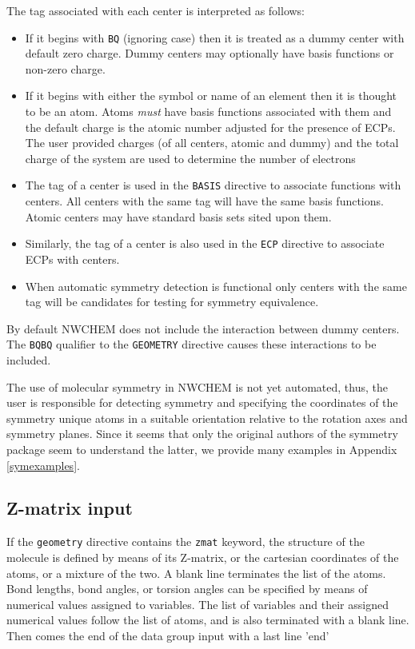The tag associated with each center is interpreted as follows:
\begin{itemize}
\item If it begins with \verb+BQ+ (ignoring case) then it is treated
      as a dummy center with default zero charge. Dummy centers may 
      optionally have basis functions or non-zero charge.
\item If it begins with either the symbol or name of an element then
      it is thought to be an atom.  Atoms {\em must} have basis
      functions associated with them and the default charge is the
      atomic number adjusted for the presence of ECPs.  The user
      provided charges (of all centers, atomic and dummy) and the
      total charge of the system are used to determine the number of
      electrons
\item The tag of a center is used in the \verb+BASIS+ directive to
      associate functions with centers.  All centers with the same tag
      will have the same basis functions.  Atomic centers may have
      standard basis sets sited upon them.
\item Similarly, the tag of a center is also used in the \verb+ECP+
      directive to associate ECPs with centers.
\item When automatic symmetry detection is functional only centers
      with the same tag will be candidates for testing for symmetry
      equivalence.
\end{itemize}

By default NWCHEM does not include the interaction between dummy
centers.  The \verb+BQBQ+ qualifier to the \verb+GEOMETRY+ directive
causes these interactions to be included.

 The use of molecular symmetry in NWCHEM is not yet automated, thus,
the user is responsible for detecting symmetry and specifying the
coordinates of the symmetry unique atoms in a suitable orientation
relative to the rotation axes and symmetry planes.  Since it seems
that only the original authors of the symmetry package seem to
understand the latter, we provide many examples in Appendix
\ref{symexamples}.

\subsection{Z-matrix input}
\label{sec:Z-matrix}
 
If the \verb+geometry+ directive contains the \verb+zmat+ keyword, the
structure of the molecule is defined by means of its Z-matrix, or
the cartesian coordinates of the atoms, or a mixture of the two. A
blank line terminates the list of the atoms.  Bond lengths,  bond
angles, or torsion angles can be specified by means of numerical
values assigned to variables. The list of variables and  their
assigned numerical  values  follow  the  list  of atoms, and is also
terminated with a blank line.  Then comes the end of the data group
input with a last line 'end'


